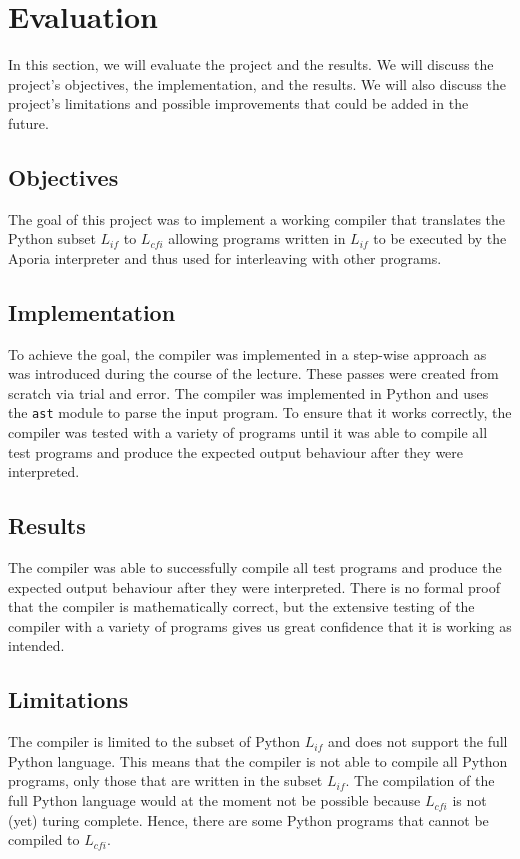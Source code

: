 \section{Evaluation}

In this section, we will evaluate the project and the results. We will discuss the project's objectives, the implementation, and the results. We will also discuss the project's limitations and possible improvements that could be added in the future.

\subsection{Objectives}
The goal of this project was to implement a working compiler that translates the Python subset $L_{if}$ to $L_{cfi}$ allowing programs written in $L_{if}$ to be executed by the Aporia interpreter and thus used for interleaving with other programs.

\subsection{Implementation}
To achieve the goal, the compiler was implemented in a step-wise approach as was introduced during the course of the lecture. These passes were created from scratch via trial and error. The compiler was implemented in Python and uses the \texttt{ast} module to parse the input program. To ensure that it works correctly, the compiler was tested with a variety of programs until it was able to compile all test programs and produce the expected output behaviour after they were interpreted.

\subsection{Results}
The compiler was able to successfully compile all test programs and produce the expected output behaviour after they were interpreted. There is no formal proof that the compiler is mathematically correct, but the extensive testing of the compiler with a variety of programs gives us great confidence that it is working as intended.

\subsection{Limitations}
The compiler is limited to the subset of Python $L_{if}$ and does not support the full Python language. This means that the compiler is not able to compile all Python programs, only those that are written in the subset $L_{if}$.
The compilation of the full Python language would at the moment not be possible because $L_{cfi}$ is not (yet) turing complete. Hence, there are some Python programs that cannot be compiled to $L_{cfi}$.

